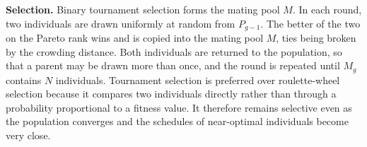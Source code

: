 \documentclass[12pt]{article}
\begin{document}
\begin{sloppypar}
        \textbf{Selection.} Binary tournament selection forms the mating pool $M$. In each round, two
        individuals are drawn uniformly at random from $P_{g-1}$. The better of
        the two on the Pareto rank wins and is copied into the mating pool $M$, ties being broken by
        the crowding distance. Both individuals are returned to the population, so that a parent may
        be drawn more than once, and the round is repeated until $M_g$ contains $N$ individuals.
        Tournament selection is preferred over roulette-wheel selection because it compares two
        individuals directly rather than through a probability proportional to a fitness value. It
        therefore
        remains selective even as the population converges and the schedules of near-optimal
        individuals become very close.
        

\end{sloppypar}
\end{document}
